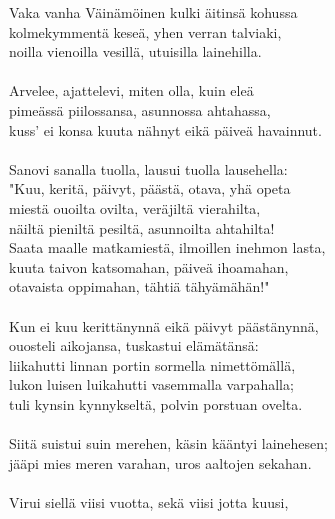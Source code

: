 Vaka vanha Väinämöinen kulki äitinsä kohussa                \\
kolmekymmentä keseä, yhen verran talviaki,                  \\
noilla vienoilla vesillä, utuisilla lainehilla.             \\
                                                            \\
Arvelee, ajattelevi, miten olla, kuin eleä                  \\
pimeässä piilossansa, asunnossa ahtahassa,                  \\
kuss' ei konsa kuuta nähnyt eikä päiveä havainnut.          \\
                                                            \\
Sanovi sanalla tuolla, lausui tuolla lausehella:            \\
"Kuu, keritä, päivyt, päästä, otava, yhä opeta              \\
miestä ouoilta ovilta, veräjiltä vierahilta,                \\
näiltä pieniltä pesiltä, asunnoilta ahtahilta!              \\
Saata maalle matkamiestä, ilmoillen inehmon lasta,          \\
kuuta taivon katsomahan, päiveä ihoamahan,                  \\
otavaista oppimahan, tähtiä tähyämähän!"                    \\
                                                            \\
Kun ei kuu kerittänynnä eikä päivyt päästänynnä,            \\
ouosteli aikojansa, tuskastui elämätänsä:                   \\
liikahutti linnan portin sormella nimettömällä,             \\
lukon luisen luikahutti vasemmalla varpahalla;              \\
tuli kynsin kynnykseltä, polvin porstuan ovelta.            \\
                                                            \\
Siitä suistui suin merehen, käsin kääntyi lainehesen;       \\
jääpi mies meren varahan, uros aaltojen sekahan.            \\
                                                            \\
Virui siellä viisi vuotta, sekä viisi jotta kuusi,          \\
